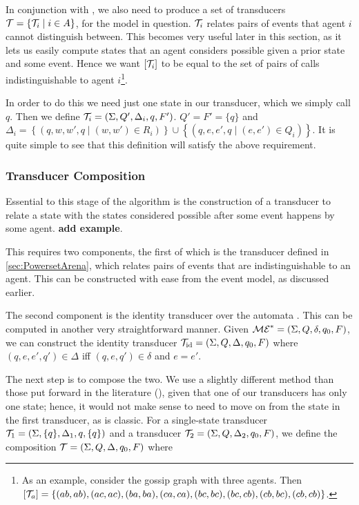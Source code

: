 \documentclass[12pt, a4paper]{article}
\begin{document}
In conjunction with \mestar, we also need to produce a set of transducers
$\mathcal{T} = \{\mathcal{T}_i \mid i \in A\}$, for the model in question. $\mathcal{T}_i$
relates pairs of events that agent $i$ cannot distinguish between. This becomes
very useful later in this section, as it lets us easily compute states that an
agent considers possible given a prior state and some event. Hence we want
$\left[ \mathcal{T}_i \right]$ to be equal to the set of pairs of calls
indistinguishable to agent $i$\footnote{As an example, consider the gossip graph
  with three agents. Then $\left[ \mathcal{T}_a \right] = \left\{ (ab, ab), (ac, ac),
    (ba, ba), (ca, ca), (bc, bc), (bc, cb), (cb, bc), (cb, cb) \right\} $.}.


In order to do this we need just one state in our transducer, which we simply
call $q$. Then we define $\mathcal{T}_i = (\Sigma, Q', \Delta_i, q, F')$. $Q' = F' =
\{q\}$ and $\Delta_i = \left\{ (q, w, w', q \mid (w, w') \in R_i) \right\} \cup
\left\{ (q, e, e', q \mid (e, e') \in Q_i) \right\}$. It is quite simple to see
that this definition will satisfy the above requirement. 

\subsubsection{Transducer Composition}
\label{subsubsec:TransducerComposition}

Essential to this stage of the algorithm is the construction of a transducer to
relate a state with the states considered possible after some event happens by
some agent. \textbf{add example}.

This requires two components, the first of which is the transducer defined in
\ref{sec:PowersetArena}, which relates pairs of events that are
indistinguishable to an agent. This can be constructed with ease from the event
model, as discussed earlier.

The second component is the identity transducer over the automata \mestar. This
can be computed in another very straightforward manner. Given $\mathcal{ME}^\ast =
(\Sigma, Q, \delta, q_0, F)$, we can construct the identity transducer
$\mathcal{T}_{\text{id}} = (\Sigma, Q, \Delta, q_0, F)$ where $(q, e, e', q') \in
\Delta$ iff $(q, e, q') \in \delta$ and $e = e'$. 

The next step is to compose the two. We use a slightly different method than
those put forward in the literature (\cite{ComposingFSTs}), given that one of
our transducers has only one state; hence, it would not make sense to need to
move on from the state in the first transducer, as is classic. For a
single-state transducer $\mathcal{T}_1 = (\Sigma, \{q\}, \Delta_1, q, \{q\})$ and
a transducer $\mathcal{T}_2 = (\Sigma, Q, \Delta_2, q_0, F)$, we define the
composition $\mathcal{T} = (\Sigma, Q, \Delta, q_0, F)$ where 
\end{document}
